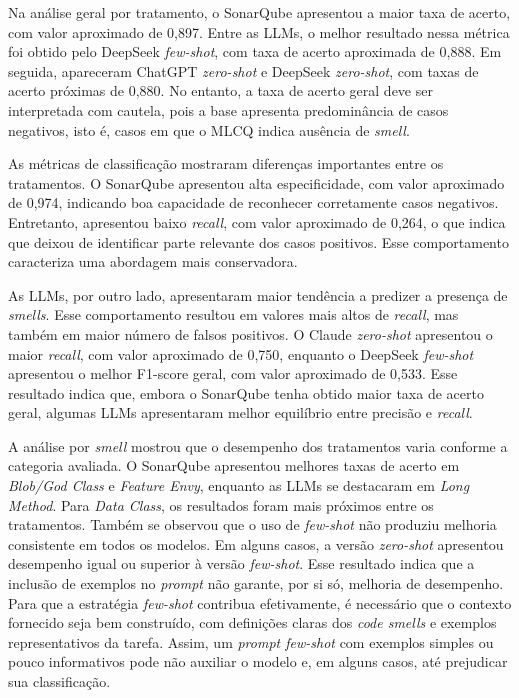 Na análise geral por tratamento, o SonarQube apresentou a maior taxa de acerto, com valor aproximado de 0,897. Entre as LLMs, o 
melhor resultado nessa métrica foi obtido pelo DeepSeek \textit{few-shot}, com taxa de acerto aproximada de 0,888. Em seguida, apareceram 
ChatGPT \textit{zero-shot} e DeepSeek \textit{zero-shot}, com taxas de acerto próximas de 0,880. No entanto, a taxa de acerto geral deve ser 
interpretada com cautela, pois a base apresenta predominância de casos negativos, isto é, casos em que o MLCQ indica ausência de \textit{smell}.

As métricas de classificação mostraram diferenças importantes entre os tratamentos. O SonarQube apresentou alta especificidade, 
com valor aproximado de 0,974, indicando boa capacidade de reconhecer corretamente casos negativos. Entretanto, apresentou baixo 
\textit{recall}, com valor aproximado de 0,264, o que indica que deixou de identificar parte relevante dos casos positivos. 
Esse comportamento caracteriza uma abordagem mais conservadora.

As LLMs, por outro lado, apresentaram maior tendência a predizer a presença de \textit{smells}. Esse comportamento resultou 
em valores mais altos de \textit{recall}, mas também em maior número de falsos positivos. O Claude \textit{zero-shot} apresentou o 
maior \textit{recall}, com valor aproximado de 0,750, enquanto o DeepSeek \textit{few-shot} apresentou o melhor F1-score geral, com 
valor aproximado de 0,533. Esse resultado indica que, embora o SonarQube tenha obtido maior taxa de acerto geral, algumas 
LLMs apresentaram melhor equilíbrio entre precisão e \textit{recall}.

A análise por \textit{smell} mostrou que o desempenho dos tratamentos varia conforme a categoria avaliada. O SonarQube 
apresentou melhores taxas de acerto em \textit{Blob/God Class} e \textit{Feature Envy}, enquanto as LLMs se destacaram em \textit{Long Method}. 
Para \textit{Data Class}, os resultados foram mais próximos entre os tratamentos. Também se observou que o uso de \textit{few-shot} não 
produziu melhoria consistente em todos os modelos. Em alguns casos, a versão \textit{zero-shot} apresentou desempenho igual ou superior à versão \textit{few-shot}. Esse resultado indica que a inclusão de exemplos no \textit{prompt} não garante, por si só, melhoria de desempenho. Para que a estratégia \textit{few-shot} contribua efetivamente, é necessário que o contexto fornecido seja bem construído, com definições claras dos \textit{code smells} e exemplos representativos da tarefa. Assim, um \textit{prompt few-shot} com exemplos simples ou pouco informativos pode não auxiliar o modelo e, em alguns casos, até prejudicar sua classificação.

